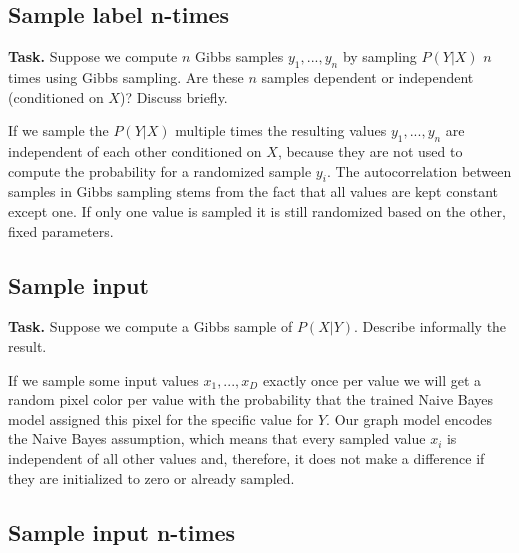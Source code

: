 \documentclass{support/acm_proc_article-sp}
\begin{document}

    \subsection{Sample label n-times}

    \textbf{Task.} Suppose we compute $n$ Gibbs samples $y_1, ..., y_n$ by sampling $P(Y | X)$ $n$ times using Gibbs sampling.
    Are these $n$ samples dependent or independent (conditioned on $X$)?
    Discuss briefly.

    If we sample the $P(Y | X)$ multiple times the resulting values $y_1,..., y_n$ are independent of each other
    conditioned on $X$, because they are not used to compute the probability for a randomized sample $y_i$.
    The autocorrelation between samples in Gibbs sampling stems from the fact that all values are kept constant except one.
    If only one value is sampled it is still randomized based on the other, fixed parameters.


    \subsection{Sample input}
    \label{sec:sample-input}

    \textbf{Task.} Suppose we compute a Gibbs sample of $P(X | Y)$.
    Describe informally the result.

    If we sample some input values $x_1,...,x_D$ exactly once per value we will get a random pixel color per value with
    the probability that the trained Naive Bayes model assigned this pixel for the specific value for $Y$.
    Our graph model encodes the Naive Bayes assumption, which means that every sampled value $x_i$ is independent of all
    other values and, therefore, it does not make a difference if they are initialized to zero or already sampled.


    \subsection{Sample input n-times}
\end{document}
